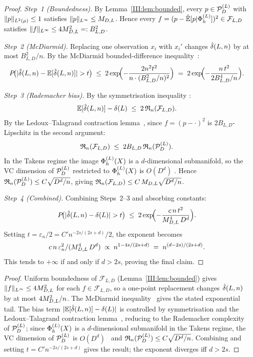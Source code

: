 \ifdraft
\begin{proof}
\emph{Step~1 (Boundedness).}
By Lemma~\ref{III:lem:bounded}, every $p \in \mathcal{P}_D^{(L)}$ with $\|p\|_{L^{2}(\mu)} \leq 1$
satisfies $\|p\|_{L^{\infty}} \leq M_{D,L}$.
Hence every $f = (p - \hat{\mathbb{E}}[p|\Phi_h^{(L)}])^2 \in \mathcal{F}_{L,D}$ satisfies
$\|f\|_{L^{\infty}} \leq 4M_{D,L}^2 =: B_{L,D}^2$.

\emph{Step~2 (McDiarmid).}
Replacing one observation $x_i$ with $x_i'$ changes
$\hat{\delta}(L,n)$ by at most $B_{L,D}^2/n$.
By the McDiarmid bounded-difference inequality~\cite{McDiarmid1989}:
\[
  P\!\bigl(|\hat{\delta}(L,n) - \mathbb{E}[\hat{\delta}(L,n)]| > t\bigr)
  \;\leq\; 2\exp\!\Bigl(-\frac{2n^2 t^2}{n \cdot (B_{L,D}^2/n)^2}\Bigr)
  \;=\; 2\exp\!\Bigl(-\frac{n\,t^2}{2B_{L,D}^4/n}\Bigr).
\]

\emph{Step~3 (Rademacher bias).}
By the symmetrisation inequality \cite{BartlettMendelson2002}:
\[
  \mathbb{E}[\hat{\delta}(L,n)] - \delta(L)
  \;\leq\; 2\,\mathfrak{R}_n(\mathcal{F}_{L,D}).
\]
By the Ledoux--Talagrand contraction lemma~\cite{LedouxTalagrand1991}, since $f = (p - \cdot)^2$ is
$2B_{L,D}$-Lipschitz in the second argument:
\[
  \mathfrak{R}_n(\mathcal{F}_{L,D})
  \;\leq\; 2B_{L,D}\,\mathfrak{R}_n(\mathcal{P}_D^{(L)}).
\]
In the Takens regime the image $\Phi_h^{(L)}(X)$ is a $d$-dimensional submanifold,
so the VC dimension of $\mathcal{P}_D^{(L)}$ restricted to $\Phi_h^{(L)}(X)$ is
$O(D^d)$ \cite{Gyorfi2002}.
Hence $\mathfrak{R}_n(\mathcal{P}_D^{(L)}) \leq C\sqrt{D^d/n}$, giving
$\mathfrak{R}_n(\mathcal{F}_{L,D}) \leq C\,M_{D,L}\sqrt{D^d/n}$.

\emph{Step~4 (Combined).}
Combining Steps~2--3 and absorbing constants:
\[
  P\!\bigl(|\hat{\delta}(L,n) - \delta(L)| > t\bigr)
  \;\leq\; 2\exp\!\Bigl(-\frac{c\,n\,t^2}{M_{D,L}^4\,D^d}\Bigr).
\]
Setting $t = \varepsilon_n/2 = C'n^{-2s/(2s+d)}/2$, the exponent becomes
\[
  c\,n\,\varepsilon_n^2 / (M_{D,L}^4\,D^d)
  \;\propto\; n^{1-4s/(2s+d)}
  \;=\; n^{(d-2s)/(2s+d)}.
\]
This tends to $+\infty$ if and only if $d > 2s$,
proving the final claim.
\end{proof}
\else
\begin{proof}
Uniform boundedness of $\mathcal{F}_{L,D}$ (Lemma~\ref{III:lem:bounded}) gives
$\|f\|_{L^{\infty}} \leq 4M_{D,L}^2$ for each $f \in \mathcal{F}_{L,D}$, so a
one-point replacement changes $\hat{\delta}(L,n)$ by at most $4M_{D,L}^2/n$.
The McDiarmid inequality~\cite{McDiarmid1989} gives the stated exponential tail.
The bias term $|\mathbb{E}[\hat{\delta}(L,n)] - \delta(L)|$ is controlled by
symmetrisation and the Ledoux--Talagrand contraction lemma~\cite{LedouxTalagrand1991},
reducing to the Rademacher complexity of $\mathcal{P}_D^{(L)}$; since $\Phi_h^{(L)}(X)$ is a
$d$-dimensional submanifold in the Takens regime, the VC dimension of $\mathcal{P}_D^{(L)}$
is $O(D^d)$~\cite{Gyorfi2002} and $\mathfrak{R}_n(\mathcal{P}_D^{(L)}) \leq C\sqrt{D^d/n}$.
Combining and setting $t = C'n^{-2s/(2s+d)}$ gives the result; the exponent
diverges iff $d > 2s$.
\end{proof}
\fi

